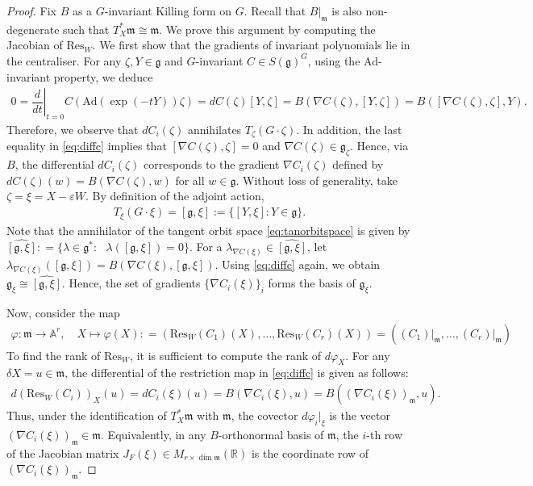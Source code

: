 \documentclass[11pt]{amsart}
\theoremstyle{definition}
\theoremstyle{plain}
\theoremstyle{conclusion}
\begin{document}
 \begin{proof}
 Fix $B$ as a $G$-invariant Killing form on $G$. Recall that $B\vert_\mathfrak{m}$ is also non-degenerate such that $T_X^*\mathfrak{m} \cong \mathfrak{m}$.    We prove this argument by computing the Jacobian of $\mathrm{Res}_W$. We first show that the gradients of invariant polynomials lie in the centraliser. For any $\zeta,Y \in \mathfrak{g}$ and $G$-invariant $C \in S(\mathfrak{g})^G$, using the Ad-invariant property, we deduce  \begin{align}
         0 = \left.\dfrac{d}{dt}\right\vert_{t = 0}C(\mathrm{Ad}(\exp(-tY))\zeta) = dC(\zeta) [Y,\zeta]  = B(\nabla C(\zeta),[Y,\zeta]) = B([\nabla C(\zeta),\zeta],Y). \label{eq:diffc}
     \end{align} Therefore, we observe that $dC_i(\zeta)$ annihilates $T_\zeta(G\cdot\zeta)$. In addition, the last equality in \eqref{eq:diffc} implies that $[\nabla C(\zeta),\zeta] = 0$ and $\nabla C(\zeta) \in \mathfrak{g}_\zeta$. Hence, via $B$, the differential $dC_i(\zeta)$ corresponds to the gradient $\nabla C_i(\zeta)$ defined by $dC(\zeta) (w) =  B(\nabla C(\zeta),w)$ for all $w \in \mathfrak{g}$. Without loss of generality, take $\zeta = \xi = X - \varepsilon W$. By definition of the adjoint action, \begin{align}
         T_\xi(G\cdot \xi) = [\mathfrak{g},\xi] := \{[Y,\xi]: Y \in \mathfrak{g}\} . \label{eq:tanorbitspace}
     \end{align}  Note that the annihilator of the tangent orbit space \eqref{eq:tanorbitspace} is given by $\widehat{[\mathfrak{g},\xi]} : = \{\lambda \in \mathfrak{g}^*: \text{ } \lambda([\mathfrak{g},\xi]) = 0\}$. For a $\lambda_{\nabla C(\xi)} \in \widehat{[\mathfrak{g},\xi]}$, let $\lambda_{\nabla C(\xi)}([\mathfrak{g},\xi]) = B(\nabla C(\xi),[\mathfrak{g},\xi])  $. Using \eqref{eq:diffc} again, we obtain $\mathfrak{g}_\xi \cong \widehat{[\mathfrak{g},\xi]}$. Hence, the set of gradients $\{\nabla C_i(\xi)\}_i$ forms the basis of $\mathfrak{g}_\xi$.

Now, consider the map \begin{align*}
    \varphi: \mathfrak{m}  \longrightarrow \mathbb{A}^r, \quad X \longmapsto \varphi(X) : =  (\mathrm{Res}_W(C_1)(X),\ldots,\mathrm{Res}_W(C_r)(X)) = \left((C_1)\vert_\mathfrak{m},\ldots,(C_r)\vert_\mathfrak{m}\right)
\end{align*} To find the rank of $\mathrm{Res}_W$, it is sufficient to compute the rank of $d \varphi_X$. For any $\delta X = u  \in \mathfrak{m}$, the differential of the restriction map in  \eqref{eq:diffc} is given as follows: \begin{align}
   d (\mathrm{Res}_W(C_i))_X(u) =  d C_i(\xi)(u) = B(\nabla C_i(\xi),u) = B(\left(\nabla C_i(\xi)\right)_\mathfrak{m},u). \label{eq:differenres}
\end{align} Thus, under the identification of $T_X^*\mathfrak{m}$ with $\mathfrak{m}$, the covector $d\varphi_i\vert_\xi$ is the vector $(\nabla C_i(\xi))_{\mathfrak{m}}\in\mathfrak{m}$. Equivalently, in any $B$-orthonormal basis of $\mathfrak{m}$, the $i$-th row of the Jacobian matrix $J_F(\xi)\in M_{r\times\dim\mathfrak{m}}(\mathbb{R})$ is the coordinate row of $(\nabla C_i(\xi))_{\mathfrak{m}}$. 


\end{proof}
\end{document}
